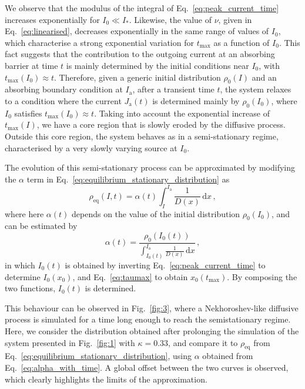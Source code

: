 {We observe that the modulus of the integral of Eq.~\eqref{eq:peak_current_time} increases exponentially for $I_0 \ll I_\ast$. Likewise, the value of $\nu$, given in Eq.~\eqref{eq:linearised}, decreases exponentially in the same range of values of $I_0$, which characterise a strong exponential variation for $t_\text{max}$ as a function of $I_0$. This fact suggests that the contribution to the outgoing current at an absorbing barrier at time $t$ is mainly determined by the initial conditions near $I_0$, with $t_\text{max}(I_0) \approx t$. Therefore, given a generic initial distribution $\rho_0(I)$ and an absorbing boundary condition at $I_\mathrm{a}$, after a transient time $t$, the system relaxes to a condition where the current $J_\mathrm{a}(t)$ is determined mainly by $\rho_0(I_0)$, where $I_0$ satisfies $t_\text{max}(I_0) \approx t$. Taking into account the exponential increase of $t_\text{max}(I)$, we have a core region that is slowly eroded by the diffusive process. Outside this core region, the system behaves as in a semi-stationary regime, characterised by a very slowly varying source at $I_0$.

The evolution of this semi-stationary process can be approximated by modifying the $\alpha$ term in Eq.~\eqref{eq:equilibrium_stationary_distribution} as
\begin{equation}
    \rho_\mathrm{eq}(I, t) = \alpha(t) \int_I^{I_\mathrm{a}} \frac{1}{D(x)}\,\mathrm{d}x\,,
    \label{eq:semi_stationary_distribution}
\end{equation}
where here $\alpha(t)$ depends on the value of the initial distribution $\rho_0(I_0)$, and can be estimated by
\begin{equation}
    \alpha(t) = \frac{\rho_0\left(I_0(t)\right)}{\displaystyle{ \int_{I_0(t)}^{I_\mathrm{a}} \frac{1}{D(x)}\,\mathrm{d}x}}\,,
    \label{eq:alpha_with_time}
\end{equation}
in which $I_0(t)$ is obtained by inverting Eq.~\eqref{eq:peak_current_time} to determine $I_0(x_0)$, and Eq.~\eqref{eq:taumax} to obtain $x_0(t_\mathrm{max})$. By composing the two functions, $I_0(t)$ is determined.

This behaviour can be observed in Fig.~\ref{fig:3}, where a Nekhoroshev-like diffusive process is simulated for a time long enough to reach the semistationary regime. Here, we consider the distribution obtained after prolonging the simulation of the system presented in Fig.~\ref{fig:1} with $\kappa=0.33$, and compare it to $\rho_\mathrm{eq}$ from Eq.~\eqref{eq:equilibrium_stationary_distribution}, using $\alpha$ obtained from Eq.~\eqref{eq:alpha_with_time}. A global offset between the two curves is observed, which clearly highlights the limits of the approximation. 

}
